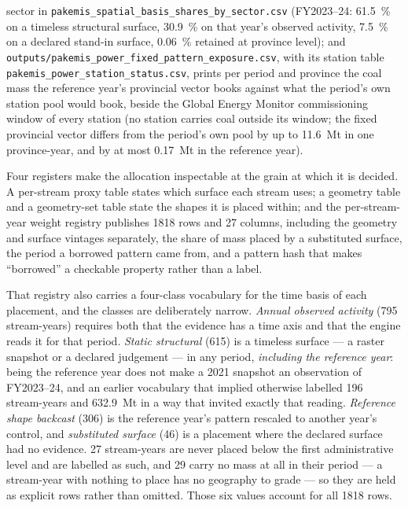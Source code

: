 \documentclass[essd]{copernicus}
\begin{document}
sector in \texttt{pakemis\_spatial\_basis\_shares\_by\_sector.csv} (FY2023--24: \SI{61.5}{\percent} on a timeless structural surface, \SI{30.9}{\percent} on that year's observed activity, \SI{7.5}{\percent} on a declared stand-in surface, \SI{0.06}{\percent} retained at province level); and \texttt{outputs/pakemis\_power\_fixed\_pattern\_exposure.csv}, with its station table \texttt{pakemis\_power\_station\_status.csv}, prints per period and province the coal mass the reference year's provincial vector books against what the period's own station pool would book, beside the Global Energy Monitor commissioning window of every station (no station carries coal outside its window; the fixed provincial vector differs from the period's own pool by up to \SI{11.6}{\mega\tonne} in one province-year, and by at most \SI{0.17}{\mega\tonne} in the reference year).

Four registers make the allocation inspectable at the grain at which it is decided. A per-stream proxy table states which surface each stream uses; a geometry table and a geometry-set table state the shapes it is placed within; and the per-stream-year weight registry publishes 1818 rows and 27 columns, including the geometry and surface vintages separately, the share of mass placed by a substituted surface, the period a borrowed pattern came from, and a pattern hash that makes ``borrowed'' a checkable property rather than a label.

That registry also carries a four-class vocabulary for the time basis of each placement, and the classes are deliberately narrow. \emph{Annual observed activity} (795 stream-years) requires both that the evidence has a time axis and that the engine reads it for that period. \emph{Static structural} (615) is a timeless surface --- a raster snapshot or a declared judgement --- in any period, \emph{including the reference year}: being the reference year does not make a 2021 snapshot an observation of FY2023--24, and an earlier vocabulary that implied otherwise labelled 196 stream-years and \SI{632.9}{\mega\tonne} in a way that invited exactly that reading. \emph{Reference shape backcast} (306) is the reference year's pattern rescaled to another year's control, and \emph{substituted surface} (46) is a placement where the declared surface had no evidence. \num{27} stream-years are never placed below the first administrative level and are labelled as such, and \num{29} carry no mass at all in their period --- a stream-year with nothing to place has no geography to grade --- so they are held as explicit rows rather than omitted. Those six values account for all \num{1818} rows.
\end{document}
